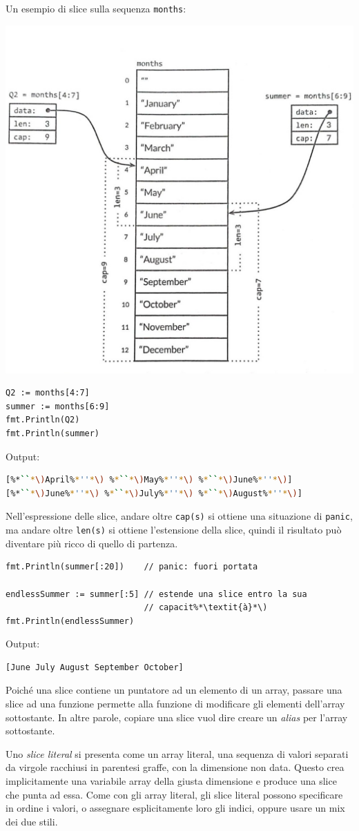 Un esempio di slice sulla sequenza \verb|months|:
\begin{center}
    \includegraphics[width=0.5\linewidth]{figures/figura3.1}
\end{center}
\begin{lstlisting}[frame=single, label={lst:lstlisting3-2.2}]
Q2 := months[4:7]
summer := months[6:9]
fmt.Println(Q2)
fmt.Println(summer)
\end{lstlisting}
Output:
\begin{lstlisting}[language=bash, frame=L, label={lst:lstlisting3-2.3}]
[%*``*\)April%*''*\) %*``*\)May%*''*\) %*``*\)June%*''*\)]
[%*``*\)June%*''*\) %*``*\)July%*''*\) %*``*\)August%*''*\)]
\end{lstlisting}
Nell'espressione delle slice, andare oltre \verb|cap(s)| si ottiene una situazione di \verb|panic|, ma andare oltre \verb|len(s)| si ottiene l'estensione della slice, quindi il risultato può diventare più ricco di quello di partenza.
\begin{lstlisting}[frame=single, label={lst:lstlisting3-2.4}]
fmt.Println(summer[:20])    // panic: fuori portata

endlessSummer := summer[:5] // estende una slice entro la sua
                            // capacit%*\textit{à}*\)
fmt.Println(endlessSummer)
\end{lstlisting}
Output:
\begin{lstlisting}[language=bash, frame=L, label={lst:lstlisting3-2.5}]
[June July August September October]
\end{lstlisting}
Poiché una slice contiene un puntatore ad un elemento di un array, passare una slice ad una funzione permette alla funzione di modificare gli elementi dell'array sottostante.
In altre parole, copiare una slice vuol dire creare un \textit{alias} per l'array sottostante.

Uno \textit{slice literal} si presenta come un array literal, una sequenza di valori separati da virgole racchiusi in parentesi graffe, con la dimensione non data.
Questo crea implicitamente una variabile array della giusta dimensione e produce una slice che punta ad essa.
Come con gli array literal, gli slice literal possono specificare in ordine i valori, o assegnare esplicitamente loro gli indici, oppure usare un mix dei due stili.

